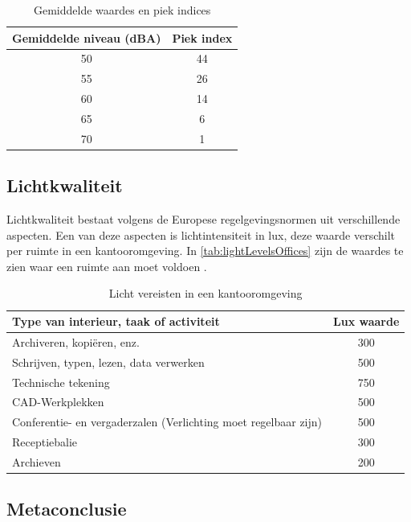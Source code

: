 \begin{table}[ht]
    \centering
    \begin{tabular}{ c | c }
        Gemiddelde niveau (dBA) & Piek index\\
        \hline
        50 & 44 \\
        55 & 26 \\
        60 & 14 \\
        65 & 6  \\
        70 & 1 
    \end{tabular}
    \caption{Gemiddelde waardes en piek indices}
    \label{tab:soundLevels}
\end{table}


\subsection{Lichtkwaliteit}

Lichtkwaliteit bestaat volgens de Europese regelgevingsnormen uit verschillende aspecten\cite{lightingIndorWorkspaces}. Een van deze aspecten is lichtintensiteit in lux, deze waarde verschilt per ruimte in een kantooromgeving. In \autoref{tab:lightLevelsOffices} zijn de waardes te zien waar een ruimte aan moet voldoen \cite{lightingIndorWorkspaces}.

\begin{table}[ht]
    \centering
    \begin{tabular}{ l | c }
        Type van interieur, taak of activiteit & Lux waarde\\
        \hline
        Archiveren, kopiëren, enz. & 300 \\
        Schrijven, typen, lezen, data verwerken & 500 \\
        Technische tekening & 750 \\
        CAD-Werkplekken & 500  \\
        Conferentie- en vergaderzalen (Verlichting moet regelbaar zijn) & 500  \\
        Receptiebalie & 300 \\
        Archieven & 200 

    \end{tabular}
    \caption{Licht vereisten in een kantooromgeving\cite{lightingIndorWorkspaces}}
    \label{tab:lightLevelsOffices}
\end{table}

\subsection{Metaconclusie}

